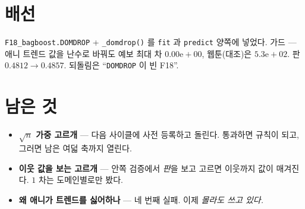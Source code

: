 \documentclass[11pt]{article}
\begin{document}
\section*{배선}

\texttt{F18\_bagboost.DOMDROP} + \texttt{\_domdrop()} 를 \texttt{fit} 과
\texttt{predict} 양쪽에 넣었다. 가드 --- 애니 트렌드 값을 난수로 바꿔도
예보 최대 차 $0.00\mathrm{e}{+}00$, 웹툰(대조)은 $5.3\mathrm{e}{+}02$.
판 $0.4812 \to \mathbf{0.4857}$. 되돌림은 ``\texttt{DOMDROP} 이 빈 F18''.

\section*{남은 것}

\begin{itemize}
\item \textbf{$\sqrt{n}$ 가중 고르개} --- 다음 사이클에 사전 등록하고
돌린다. 통과하면 규칙이 되고, 그러면 남은 여덟 축까지 열린다.
\item \textbf{이웃 값을 보는 고르개} --- 안쪽 검증에서 \emph{판}을 보고
고르면 이웃까지 값이 매겨진다. $1$ 차는 도메인별로만 봤다.
\item \textbf{왜 애니가 트렌드를 싫어하나} --- 네 번째 실패. 이제
\emph{몰라도 쓰고 있다.}
\end{itemize}
\end{document}
